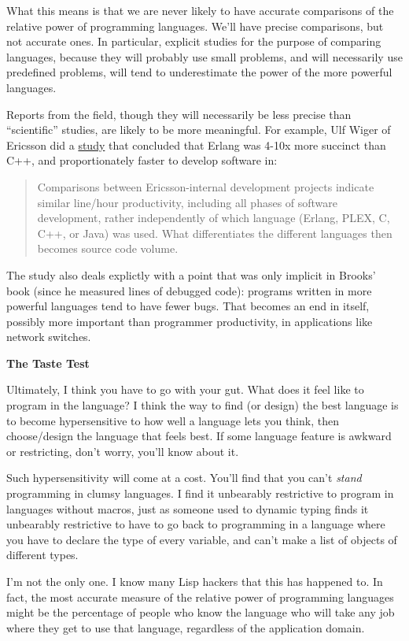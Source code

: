 What this means is that we are never likely to have accurate comparisons
of the relative power of programming languages. We'll have precise
comparisons, but not accurate ones. In particular, explicit studies for
the purpose of comparing languages, because they will probably use small
problems, and will necessarily use predefined problems, will tend to
underestimate the power of the more powerful languages.

Reports from the field, though they will necessarily be less precise
than ``scientific'' studies, are likely to be more meaningful. For
example, Ulf Wiger of Ericsson did a
\href{http://www.erlang.se/publications/Ulf_Wiger.pdf}{study} that
concluded that Erlang was 4-10x more succinct than C++, and
proportionately faster to develop software in:

\begin{quote}
Comparisons between Ericsson-internal development projects indicate
similar line/hour productivity, including all phases of software
development, rather independently of which language (Erlang, PLEX, C,
C++, or Java) was used. What differentiates the different languages then
becomes source code volume.
\end{quote}

The study also deals explictly with a point that was only implicit in
Brooks' book (since he measured lines of debugged code): programs
written in more powerful languages tend to have fewer bugs. That becomes
an end in itself, possibly more important than programmer productivity,
in applications like network switches.

\textbf{The Taste Test}

Ultimately, I think you have to go with your gut. What does it feel like
to program in the language? I think the way to find (or design) the best
language is to become hypersensitive to how well a language lets you
think, then choose/design the language that feels best. If some language
feature is awkward or restricting, don't worry, you'll know about it.

Such hypersensitivity will come at a cost. You'll find that you can't
\emph{stand} programming in clumsy languages. I find it unbearably
restrictive to program in languages without macros, just as someone used
to dynamic typing finds it unbearably restrictive to have to go back to
programming in a language where you have to declare the type of every
variable, and can't make a list of objects of different types.

I'm not the only one. I know many Lisp hackers that this has happened
to. In fact, the most accurate measure of the relative power of
programming languages might be the percentage of people who know the
language who will take any job where they get to use that language,
regardless of the application domain.

